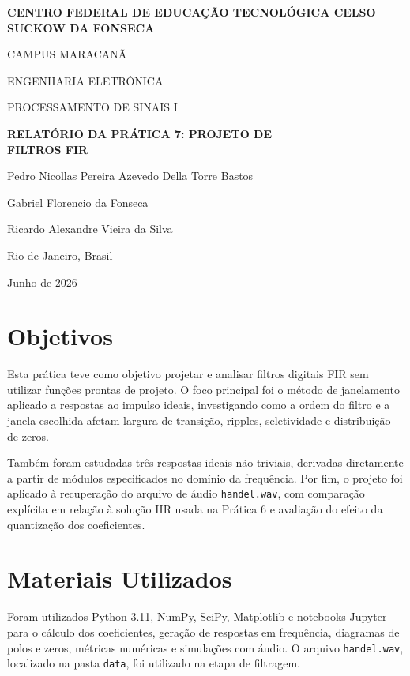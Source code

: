 \documentclass[12pt,a4paper]{article}
\begin{document}

\begin{titlepage}
    \centering
    {\Large \textbf{CENTRO FEDERAL DE EDUCAÇÃO TECNOLÓGICA CELSO\\SUCKOW DA FONSECA}\par}
    \vspace{0.25cm}
    {\Large CAMPUS MARACANÃ\par}
    {\Large ENGENHARIA ELETRÔNICA\par}
    {\Large PROCESSAMENTO DE SINAIS I\par}

    \vfill

    {\LARGE \textbf{RELATÓRIO DA PRÁTICA 7: PROJETO DE\\FILTROS FIR}\par}

    \vfill

    {\large
    Pedro Nicollas Pereira Azevedo Della Torre Bastos\par
    Gabriel Florencio da Fonseca\par
    Ricardo Alexandre Vieira da Silva\par}

    \vfill

    {\large Rio de Janeiro, Brasil\par}
    {\large Junho de 2026\par}
\end{titlepage}

\clearpage
{}
\setcounter{page}{1}

\section*{Objetivos}
Esta prática teve como objetivo projetar e analisar filtros digitais FIR sem utilizar funções prontas de projeto. O foco principal foi o método de janelamento aplicado a respostas ao impulso ideais, investigando como a ordem do filtro e a janela escolhida afetam largura de transição, ripples, seletividade e distribuição de zeros.

Também foram estudadas três respostas ideais não triviais, derivadas diretamente a partir de módulos especificados no domínio da frequência. Por fim, o projeto foi aplicado à recuperação do arquivo de áudio \texttt{handel.wav}, com comparação explícita em relação à solução IIR usada na Prática 6 e avaliação do efeito da quantização dos coeficientes.

\section*{Materiais Utilizados}
Foram utilizados Python 3.11, NumPy, SciPy, Matplotlib e notebooks Jupyter para o cálculo dos coeficientes, geração de respostas em frequência, diagramas de polos e zeros, métricas numéricas e simulações com áudio. O arquivo \texttt{handel.wav}, localizado na pasta \texttt{data}, foi utilizado na etapa de filtragem.
\end{document}
